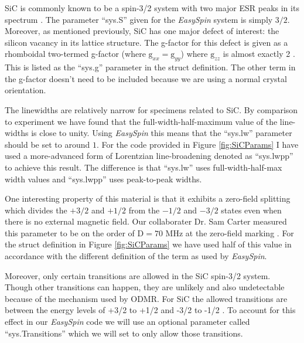 \documentclass[oneside]{BYUPhys}
\begin{document}
SiC is commonly known to be a spin-3/2 system with two major ESR peaks in its spectrum \cite{RefWorks:doc:5892964ee4b0499fa95c5108}. The parameter ``sys.S'' given for the \textit{EasySpin} system is simply $3/2$. Moreover, as mentioned previously, SiC has one major defect of interest: the silicon vacancy \cite{RefWorks:doc:58929800e4b0499fa95c51a1} \cite{RefWorks:doc:589297a9e4b0d4c09201f736} in its lattice structure. The g-factor for this defect is given as a rhomboidal two-termed g-factor (where $\text{g}_{xx}=\text{g}_{yy}$) where $\text{g}_{zz}$ is almost exactly 2 \cite{RefWorks:doc:5892964ee4b0499fa95c5108}. This is listed as the ``sys.g'' parameter in the struct definition. The other term in the g-factor doesn't need to be included because we are using a normal crystal orientation.

The linewidths are relatively narrow for specimens related to SiC. By comparison to experiment we have found that the full-width-half-maximum value of the line-widths is close to unity. Using \textit{EasySpin} this means that the ``sys.lw'' parameter should be set to around $1$. For the code provided in Figure \ref{fig:SiCParams} I have used a more-advanced form of Lorentzian line-broadening denoted as ``sys.lwpp'' to achieve this result. The difference is that ``sys.lw'' uses full-width-half-max width values and ``sys.lwpp'' uses peak-to-peak widths.

One interesting property of this material is that it exhibits a zero-field splitting which divides the $+3/2$ and $+1/2$ from the $-1/2$ and $-3/2$ states even when there is no external magnetic field. Our collaborater Dr. Sam Carter measured this parameter to be on the order of $\text{D}=70$ MHz at the zero-field marking \cite{RefWorks:doc:5892964ee4b0499fa95c5108}. For the struct definition in Figure \ref{fig:SiCParams} we have used half of this value in accordance with the different definition of the term as used by \textit{EasySpin}.

Moreover, only certain transitions are allowed in the SiC spin-3/2 system. Though other transitions can happen, they are unlikely and also undetectable because of the mechanism used by ODMR. For SiC the allowed transitions are between the energy levels of +3/2 to +1/2 and -3/2 to -1/2 \cite{RefWorks:doc:5892964ee4b0499fa95c5108}. To account for this effect in our \textit{EasySpin} code we will use an optional parameter called ``sys.Transitions'' which we will set to only allow those transitions.
\end{document}
